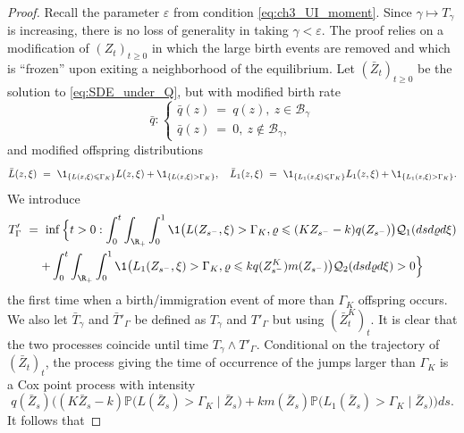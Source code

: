 \begin{refsegment}
\begin{lem}
\end{lem}


\begin{proof}
    Recall the parameter $\varepsilon$ from condition \eqref{eq:ch3_UI_moment}. Since $\gamma\mapsto T_{\gamma}$ is increasing, there is no loss of generality in taking $\gamma < \varepsilon$.
    The proof relies on  a modification of $(Z_t)_{t \geqslant 0}$ in which
    the large birth events are removed and which is ``frozen'' upon
    exiting a neighborhood of the equilibrium. Let
    $(\bar{Z}_t)_{t \geqslant 0}$ be the solution to \eqref{eq:SDE_under_Q},
    but with modified birth rate 
    \[
   \bar q: \begin{cases} 
        \bar{q}(z)\ =\ q(z),\ z\in \mathscr{B}_{\gamma}\\ 
        \bar{q}(z)\ =\ 0, \ z\notin \mathscr{B}_{\gamma},
    \end{cases}
    \]
    and modified offspring distributions
    \[
        \bar{L}(z, \xi)\ = \ \1_{\{ L(z, \xi) \leqslant \Gamma_K \}} L(z, \xi) 
        + \1_{\{ L(z, \xi) > \Gamma_K \}},
        \quad
        \bar{L}_1(z, \xi)\ =\  \1_{\{ L_1(z, \xi) \leqslant \Gamma_K \}} 
        L_1(z, \xi) + \1_{\{ L_1(z, \xi) > \Gamma_K \}}.
    \]
    We introduce
    \begin{multline*}
        T'_\Gamma \ =\ \inf\Big\{ t > 0 : 
            \int_0^t \int_{\R_+} \int_0^1 
            \1\big(L(Z_{s^-}, \xi) > \Gamma_K, \varrho \leqslant (KZ_{s^-}-k)q(Z_{s^-})\big)
            \mathcal{Q}_1(dsd\varrho d\xi) \\
            +
            \int_0^t \int_{\R_+} \int_0^1 
            \1\big(L_1(Z_{s^-}, \xi) > \Gamma_K, \varrho \leqslant k
            q(Z_{s^-}^K)m(Z_{s^-}) \big)
            \mathcal{Q}_2(dsd\varrho d\xi) > 0
        \Big\}
    \end{multline*}
    the first time when a birth/immigration event of more than $\Gamma_K$
    offspring occurs. We also let $\bar{T}_\gamma$ and $\bar{T}'_\Gamma$ be
    defined as $T_\gamma$ and $T'_\Gamma$ but using $(\bar{Z}^K_t)_t$. It
    is clear that the two processes coincide until time $T_\gamma
    \wedge T'_\Gamma$. Conditional on the trajectory of $(\bar Z_t)_t$, the process giving the time of occurrence of the jumps larger than $\Gamma_K$ is a Cox point process with intensity
    \[q(\bar{Z}_s) \Big((K\bar{Z}_s-k)
                \mathbb{P}\big(L(\bar{Z}_s) > \Gamma_K \mid \bar{Z}_s\big)+ k  m(\bar{Z}_{s})
                \mathbb{P}\big(L_1(\bar{Z}_s) > \Gamma_K \mid \bar{Z}_s\big)\Big)ds.\] 
                It follows that

\end{proof}
\end{refsegment}
